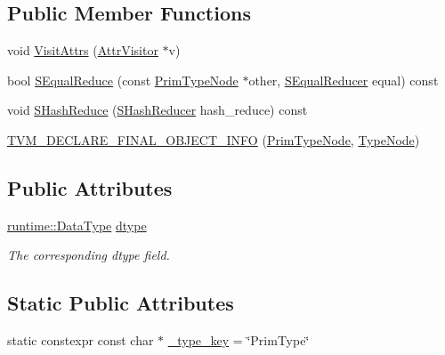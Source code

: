 \subsection*{Public Member Functions}
\begin{DoxyCompactItemize}
\item 
void \hyperlink{classtvm_1_1PrimTypeNode_a63ea742d617f0c34f2cb00ae162fd192}{Visit\+Attrs} (\hyperlink{classtvm_1_1AttrVisitor}{Attr\+Visitor} $\ast$v)
\item 
bool \hyperlink{classtvm_1_1PrimTypeNode_ae1ecf23e5d7a4b5338fadcf177d9ef96}{S\+Equal\+Reduce} (const \hyperlink{classtvm_1_1PrimTypeNode}{Prim\+Type\+Node} $\ast$other, \hyperlink{classtvm_1_1SEqualReducer}{S\+Equal\+Reducer} equal) const 
\item 
void \hyperlink{classtvm_1_1PrimTypeNode_af08c6e0fed4402ffeed9a6fe69cf9722}{S\+Hash\+Reduce} (\hyperlink{classtvm_1_1SHashReducer}{S\+Hash\+Reducer} hash\+\_\+reduce) const 
\item 
\hyperlink{classtvm_1_1PrimTypeNode_a8ac8f457c079af39001ace2e95098e95}{T\+V\+M\+\_\+\+D\+E\+C\+L\+A\+R\+E\+\_\+\+F\+I\+N\+A\+L\+\_\+\+O\+B\+J\+E\+C\+T\+\_\+\+I\+N\+FO} (\hyperlink{classtvm_1_1PrimTypeNode}{Prim\+Type\+Node}, \hyperlink{classtvm_1_1TypeNode}{Type\+Node})
\end{DoxyCompactItemize}
\subsection*{Public Attributes}
\begin{DoxyCompactItemize}
\item 
\hyperlink{classtvm_1_1runtime_1_1DataType}{runtime\+::\+Data\+Type} \hyperlink{classtvm_1_1PrimTypeNode_a3095121c58f824e258f2ac2f345ae7d1}{dtype}
\begin{DoxyCompactList}\small\item\em The corresponding dtype field. \end{DoxyCompactList}\end{DoxyCompactItemize}
\subsection*{Static Public Attributes}
\begin{DoxyCompactItemize}
\item 
static constexpr const char $\ast$ \hyperlink{classtvm_1_1PrimTypeNode_a711129730780a378013cd8bf2e447a2b}{\+\_\+type\+\_\+key} = \char`\"{}Prim\+Type\char`\"{}
\end{DoxyCompactItemize}


